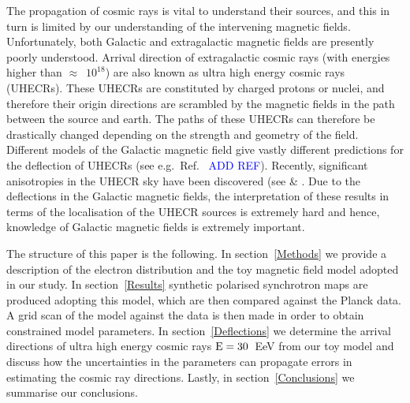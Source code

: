 \documentclass[usenatbib]{mnras}
\newcommand{\Arjen}[1]{{\color{brown}#1}}
\newcommand{\Vasu}[1]{{\color{purple}#1}}
\begin{document}

The propagation of cosmic rays is vital to understand their sources, and this in turn is limited by our understanding of the intervening magnetic fields. Unfortunately, both Galactic and extragalactic magnetic fields are presently poorly understood. Arrival direction of extragalactic cosmic rays (with energies higher than $\approx$~$10^{18}$) are also known as ultra high energy cosmic rays (UHECRs). These UHECRs are constituted by charged protons or nuclei, and therefore their origin directions are scrambled by the magnetic fields in the path between the source and earth. The paths of these UHECRs can therefore be drastically changed depending on the strength and geometry of the field. Different models of the Galactic magnetic field give vastly different predictions for the deflection of UHECRs (see e.g.~Ref.~ \cite{FARRAR_2014} \textcolor{blue}{ADD REF}). Recently, significant anisotropies in the UHECR sky have been discovered (see \cite{ICRC_2021} \cite{Auger_Starburst2018} \& \cite{ICRC_2019}. Due to the deflections in the Galactic magnetic fields, the interpretation of these results in terms of the localisation of the UHECR sources is extremely hard and hence, knowledge of Galactic magnetic fields is extremely important. 



The structure of this paper is the following. In section~\ref{Methods} we provide a description of the electron distribution and the toy magnetic field model adopted in our study. In section~\ref{Results} synthetic polarised synchrotron maps are produced adopting this model, which are then compared against the Planck data. A grid scan of the model against the data is then made in order to obtain constrained model parameters. In section~\ref{Deflections} we determine the arrival directions of ultra high energy cosmic rays $\rm E = 30$~EeV from our toy model and discuss how the uncertainties in the parameters can propagate errors in estimating the cosmic ray directions. %
Lastly, in section~\ref{Conclusions} we summarise our conclusions.
\end{document}
